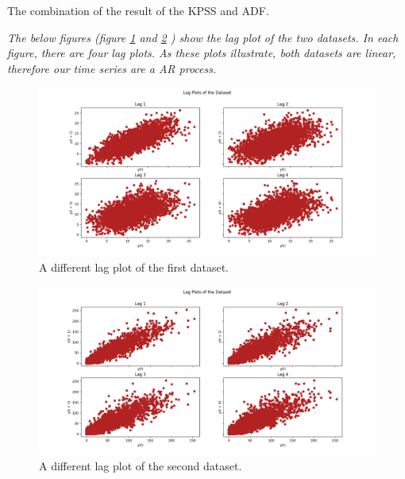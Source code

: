\begin{table}[H]
\centering
\caption{The combination of the result of the \gls{KPSS} and \gls{ADF}.}
\label{tab:1}

\end{table}

\textit{The below figures (figure \ref{fig:Ass1_D1_Lag_Plots} and \ref{fig:Ass1_D2_Lag_Plots} ) show the lag plot of the two datasets. In each figure, there are four lag plots. As these plots illustrate, both datasets are linear, therefore our time series are a AR process.  }


\begin{figure}[H]
    \centering
    \begin{minipage}[b]{1\textwidth}
        \includegraphics[width=\textwidth]{figures/Ass1/Ass1_D1_Lag_Plots.png}
    \end{minipage}
    \caption{A different lag plot of the first dataset.}
    \label{fig:Ass1_D1_Lag_Plots}
\end{figure}

\begin{figure}[H]
    \centering
    \begin{minipage}[b]{1\textwidth}
        \includegraphics[width=\textwidth]{figures/Ass1/Ass1_D2_Lag_Plots.png}
    \end{minipage}
    \caption{A different lag plot of the second dataset.}
    \label{fig:Ass1_D2_Lag_Plots}
\end{figure}





